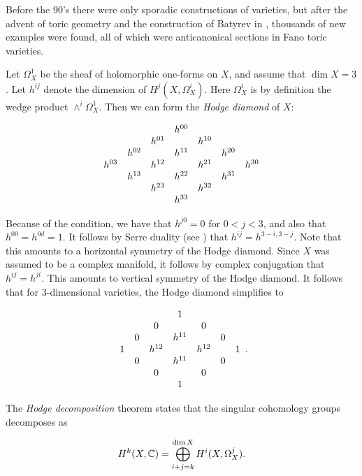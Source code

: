 Before the 90's there were only sporadic constructions of \CY varieties, but after the advent of toric geometry and the construction of Batyrev in \cite{batyrev_mirrorsymmetry}, thousands of new examples were found, all of which were anticanonical sections in Fano toric varieties. 

Let $\Omega_X^1$ be the sheaf of holomorphic one-forms on $X$, and assume that $\dim X =3$. Let $h^{ij}$ denote the dimension of $H^j(X,\Omega_X^i)$. Here $\Omega_X^i$ is by definition the wedge product $\wedge^i \Omega_X^1$.  Then we can form the \emph{Hodge diamond} of $X$:

\[
\begin{array}[c]{ccccccc}
&&&               h^{00} \\  
 &         & h^{01} & & h^{10}  \\
&	h^{02} && h^{11}  && h^{20}  \\
   h^{03} && h^{12} && h^{21} && h^{30} \\
&	h^{13} && h^{22}  && h^{31}  \\
 &         & h^{23} & & h^{32}  \\
                &&& h^{33} 
\end{array}
\]

Because of the \CY condition, we have that $h^{j0}=0$ for $0 < j < 3$, and also that $h^{00}=h^{0d}=1$. It follows by Serre duality (see \cite[Corollary 7.7, Chapter III]{hartshorne}) that $h^{ij}=h^{3-i,3-j}$. Note that this amounts to a horizontal symmetry of the Hodge diamond. Since $X$ was assumed to be a complex manifold, it follows by complex conjugation that $h^{ij}=h^{ji}$. This amounts to vertical symmetry of the Hodge diamond. It follows that for 3-dimensional \CY varieties, the Hodge diamond simplifies to

\[
\begin{array}[c]{ccccccc}
&&& 1 \\  
 &         & 0 & & 0  \\
&	0 && h^{11}  && 0  \\
1 && h^{12} && h^{12} && 1 \\
&	0 && h^{11}  && 0  \\
 &         & 0 & & 0  \\
 &&& 1 
\end{array}.
\]

The \emph{Hodge decomposition} theorem \cite[page 142]{voison_cg} states that the singular cohomology groups decomposes as

$$
H^k(X,\mathbb{C}) = \bigoplus_{i+j=k}^{\dim X} H^i(X,\Omega_X^j).
$$

